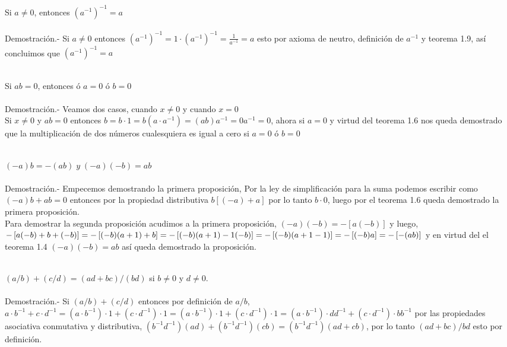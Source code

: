 \begin{teo}
Si $a\neq 0$, entonces $(a^{-1})^{-1}=a$\\\\
Demostración.- \;
Si $a\neq 0$ entonces  $(a^{-1})^{-1} = 1\cdot (a^{-1})^{-1} = \displaystyle\frac{1}{a^{-1}}=a$ esto por axioma de neutro, definición de $a^{-1}$ y teorema 1.9, así concluimos que $(a^{-1})^{-1}=a $ \\\\
\end{teo}

\begin{teo}
Si $ab = 0$, entonces ó $a=0$ ó $b=0$\\\\
Demostración.- \;
Veamos dos casos, cuando $x\neq 0$ y cuando $x=0$\\
Si $x\neq 0$ y  $ab = 0$ entonces  $b=b\cdot 1 = b (a\cdot a^{-1}) = (ab)a^{-1}=0a^{-1}=0$, ahora si $a=0$ y virtud del teorema 1.6 nos queda demostrado que la multiplicación de dos números cualesquiera es igual a cero si $a=0$ ó $b=0$  \\\\
\end{teo}

\begin{teo}
$(-a)b=-(ab) \; y \; (-a)(-b) = ab$\\\\
Demostración.- \;
Empecemos demostrando la primera proposición, Por la ley de simplificación para la suma podemos escribir como $(-a)b+ab=0$ entonces por la propiedad distributiva $b\left[ (-a)+a \right]$ por lo tanto $b\cdot 0$, luego por el teorema 1.6 queda demostrado la primera proposición.\\
Para demostrar la segunda proposición acudimos a la primera proposición, $(-a)(-b)=-\left[ a(-b)\right]$ y luego, \\ $-\left[ a(-b)+b+(-b)\right]=-\left[ (-b)(a+1)+b\right]=-\left[ (-b)(a+1)-1(-b)\right]=-\left[( -b)(a+1-1)\\\right]=-\left[ (-b)a\right]=-\left[ -(ab)\right]$ y en virtud  del el teorema 1.4 $(-a)(-b)=ab$ así queda demostrado la proposición.  \\\\
\end{teo}

\begin{teo}
$\left(a/b \right) + \left(c/d \right) = \left( ad+bc  \right) / \left( bd \right) $ si $b\neq 0$ y $d\neq 0$.\\\\
Demostración.- \;
Si $\left(a/b \right) + \left(c/d \right)$ entonces por definición de $a/b$, $a\cdot b^{-1}+c\cdot d^{-1}=(a\cdot b^{-1})\cdot 1+(c\cdot d^{-1})\cdot 1=(a\cdot b^{-1})\cdot 1+(c\cdot d^{-1})\cdot 1=(a\cdot b^{-1})\cdot dd^{-1}+(c\cdot d^{-1})\cdot bb^{-1}$ por las propiedades asociativa  conmutativa y distributiva, $(b^{-1}d^{-1})(ad)+(b^{-1}d^{-1})(cb)=(b^{-1}d^{-1})(ad+cb)$, por lo tanto $(ad+bc)/bd$ esto por definición.\\\\
\end{teo}

